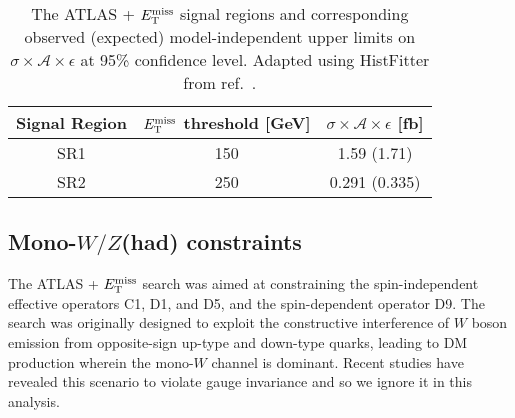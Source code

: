 \begin{table}[!htbp]
  \begin{center}
    \begin{tabular}{c|c|c}
      \hline
      \hline
      Signal Region & $E_{\mathrm{T}}^{\mathrm{miss}}$ threshold [GeV] & $\sigma \times \mathcal{A} \times \epsilon$ [fb] \\
      \hline
      SR1 & 150 & 1.59 (1.71) \\
      SR2 & 250 & 0.291 (0.335) \\
      \hline
      \hline
    \end{tabular}
  \end{center}
  \caption{The ATLAS \monoZ + $E_{\mathrm{T}}^{\mathrm{miss}}$ signal regions and corresponding observed (expected) model-independent upper limits on $\sigma \times \mathcal{A} \times \epsilon$ at 95\% confidence level. Adapted using HistFitter from ref.~\cite{Aad:2014monoZlep}.}
  \label{tab:sigmalim_monoZ}
\end{table}

\subsection{Mono-$W/Z$(had) constraints}
\label{monoWZ_constraints}

The ATLAS \monoWZ + $E_{\mathrm{T}}^{\mathrm{miss}}$ search \cite{Aad:2013monoWZ} was aimed at constraining the spin-independent effective operators C1, D1, and D5, and the spin-dependent operator D9. The search was originally designed to exploit the constructive interference of $W$ boson emission from opposite-sign up-type and down-type quarks, leading to DM production wherein the mono-$W$ channel is dominant. Recent studies \cite{Bell:gaugeInv} have revealed this scenario to violate gauge invariance and so we ignore it in this analysis.
%


